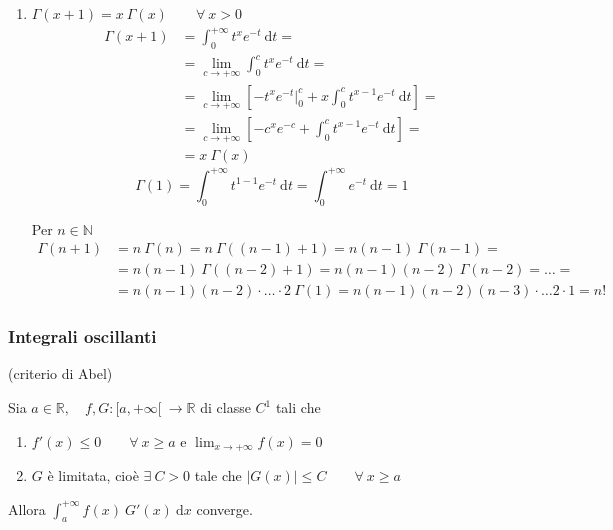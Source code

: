 \begin{exbar}
\begin{example}
\begin{enumerate}
		\item $\Gamma(x+1) = x \ \Gamma(x) \qquad \forall \ x > 0$
		\begin{align*}
			\Gamma(x+1)
			&=\int_{0}^{+\infty} t^{x} e^{-t} \ \mathrm{d}t =
			\\
			&=  \lim_{c \rightarrow + \infty} \int_{0}^{c} t^{x} e^{-t} \ \mathrm{d}t =
			\\
			&= \lim_{c \rightarrow + \infty} \left[ -t^x e^{-t} \bigg|_{0}^c + x \int_{0}^{c} t^{x-1} e^{-t} \ \mathrm{d}t \right] = 
			\\
			&= \lim_{c \rightarrow + \infty} \left[ -c^x e^{-c} + \int_{0}^{c} t^{x-1} e^{-t} \ \mathrm{d}t \right] = 
			\\
			&= x \ \Gamma(x)
		\end{align*}
		\begin{equation*}
			\Gamma(1) = \int_{0}^{+\infty} t^{1 - 1} e^{-t} \ \mathrm{d}t = \int_{0}^{+\infty} e^{-t} \ \mathrm{d}t = 1
		\end{equation*}
		
		Per $n \in \mathbb{N}$
		\begin{align*}
			\Gamma(n+1)
			&= n \ \Gamma(n) = n \ \Gamma((n-1)+1) = n (n-1) \ \Gamma(n-1) =
			\\
			&= n(n-1) \ \Gamma((n-2)+1) = n(n-1)(n-2) \ \Gamma(n-2) = \ldots =
			\\
			&= n(n-1)(n-2) \cdot \ldots \cdot 2 \ \Gamma(1) = n(n-1)(n-2)(n-3) \cdot \ldots 2 \cdot 1 = n!    
		\end{align*}
	\end{enumerate}
\end{example}
\end{exbar}


\subsubsection{Integrali oscillanti}
\begin{theorem} (criterio di Abel)
\label{th: criterio di Abel}

Sia  $a \in \mathbb{R}, \quad f,G : [a,+\infty[ \ \rightarrow \mathbb{R}$ di classe $C^1$ tali che
\begin{enumerate}
	\item $f'(x) \leq 0 \qquad \forall \ x \geq a$ e $\lim_{x \rightarrow +\infty} f(x) = 0$
	\item $G$ è limitata, cioè $\exists \ C > 0$ tale che $ |G(x)| \leq C \qquad \forall \ x \geq a$
\end{enumerate}

Allora $\int_{a}^{+\infty} f(x) \ G'(x) \ \mathrm{d}x$ converge.
\end{theorem}


